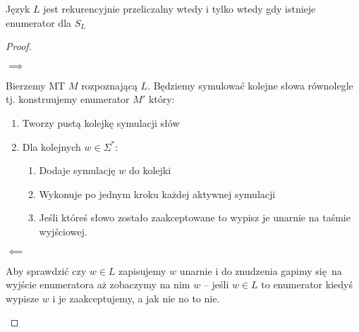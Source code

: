 \begin{theorem}
	Język \( L \) jest rekurencyjnie przeliczalny wtedy i tylko wtedy gdy istnieje enumerator dla \( S_L \)
\end{theorem}
\begin{proof}
	\begin{description}
		\item \( \implies \)

		      Bierzemy MT \( M \) rozpoznającą \( L \).
		      Będziemy symulować kolejne słowa równolegle tj. konstruujemy enumerator \( M' \) który:
		      \begin{enumerate}
			      \item Tworzy pustą kolejkę symulacji słów
			      \item Dla kolejnych \( w \in \Sigma^* \):
			            \begin{enumerate}
				            \item Dodaje symulację \( w \) do kolejki
				            \item Wykonuje po jednym kroku każdej aktywnej symulacji
				            \item Jeśli któreś słowo zostało zaakceptowane to wypisz je unarnie na taśmie wyjściowej.
			            \end{enumerate}
		      \end{enumerate}

		\item \( \impliedby \)

		      Aby sprawdzić czy \( w \in L \) zapisujemy \( w \) unarnie i do znudzenia gapimy się na wyjście enumeratora aż zobaczymy na nim \( w \) -- jeśli \( w \in L \) to enumerator kiedyś wypisze \( w \) i je zaakceptujemy, a jak nie no to nie.

	\end{description}
\end{proof}

